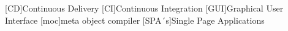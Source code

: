 \begin{acronym}[IEEE]
	[CD]{Continuous Delivery}
	[CI]{Continuous Integration}
	[GUI]{Graphical User Interface}
	[moc]{meta object compiler}
	[SPA´s]{Single Page Applications}
\end{acronym}
